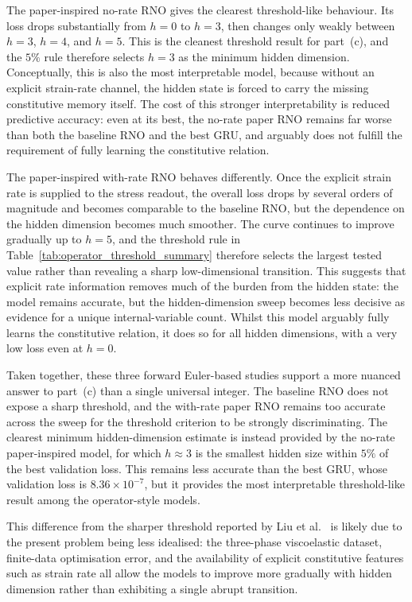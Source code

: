 \documentclass[11pt,a4paper, onecolumn]{article}
\begin{document}
The paper-inspired no-rate RNO gives the clearest threshold-like behaviour. Its loss drops substantially from $h=0$ to $h=3$, then changes only weakly between $h=3$, $h=4$, and $h=5$. This is the cleanest threshold result for part~(c), and the $5\%$ rule therefore selects $h=3$ as the minimum hidden dimension. Conceptually, this is also the most interpretable model, because without an explicit strain-rate channel, the hidden state is forced to carry the missing constitutive memory itself. The cost of this stronger interpretability is reduced predictive accuracy: even at its best, the no-rate paper RNO remains far worse than both the baseline RNO and the best GRU, and arguably does not fulfill the requirement of fully learning the
constitutive relation.

The paper-inspired with-rate RNO behaves differently. Once the explicit strain rate is supplied to the stress readout, the overall loss drops by several orders of magnitude and becomes comparable to the baseline RNO, but the dependence on the hidden dimension becomes much smoother. The curve continues to improve gradually up to $h=5$, and the threshold rule in Table~\ref{tab:operator_threshold_summary} therefore selects the largest tested value rather than revealing a sharp low-dimensional transition. This suggests that explicit rate information removes much of the burden from the hidden state: the model remains accurate, but the hidden-dimension sweep becomes less decisive as evidence for a unique internal-variable count. Whilst this model arguably fully learns the constitutive relation, it does so for all hidden dimensions, with a very low loss even at $h=0$.

Taken together, these three forward Euler-based studies support a more nuanced answer to part~(c) than a single universal integer. The baseline RNO does not expose a sharp threshold, and the with-rate paper RNO remains too accurate across the sweep for the threshold criterion to be strongly discriminating. The clearest minimum hidden-dimension estimate is instead provided by the no-rate paper-inspired model, for which $h\approx 3$ is the smallest hidden size within $5\%$ of the best validation loss. This remains less accurate than the best GRU, whose validation loss is $8.36\times10^{-7}$, but it provides the most interpretable threshold-like result among the operator-style models.

This difference from the sharper threshold reported by Liu et al.~\cite{Liu_2023} is likely due to the present problem being less idealised: the three-phase viscoelastic dataset, finite-data optimisation error, and the availability of explicit constitutive features such as strain rate all allow the models to improve more gradually with hidden dimension rather than exhibiting a single abrupt transition.
\end{document}
